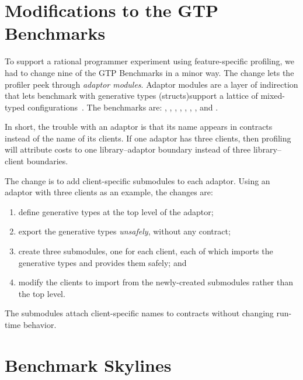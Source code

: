\section{Modifications to the GTP Benchmarks}
\label{s:adaptor-rewrite}

To support a rational programmer experiment using feature-specific profiling,
we had to change nine of the GTP Benchmarks in a minor way.
The change lets the profiler peek through \emph{adaptor modules}.
Adaptor modules are a layer of indirection that lets benchmark with
generative types (structs)support a lattice of mixed-typed
configurations~\cite{gtp-benchmarks,tfgnvf-popl-2016}.
The benchmarks are:
, ,
, , , ,
, and .

In short, the trouble with an adaptor is that its name appears
in contracts instead of the name of its clients.
If one adaptor has three clients, then profiling will attribute costs to one
library--adaptor boundary instead of three library--client boundaries.

The change is to add client-specific submodules to each adaptor.
Using an adaptor with three clients as an example, the changes are:
\begin{enumerate}
  \item
    define generative types at the top level of the adaptor;
  \item
    export the generative types \emph{unsafely}, without any contract;
  \item
    create three submodules, one for each client, each of which imports
    the generative types and provides them safely; and
  \item
    modify the clients to import from the newly-created submodules rather
    than the top level.
\end{enumerate}
%
The submodules attach client-specific names to contracts without changing
run-time behavior.


\section{Benchmark Skylines}
\label{s:bm-sky}

